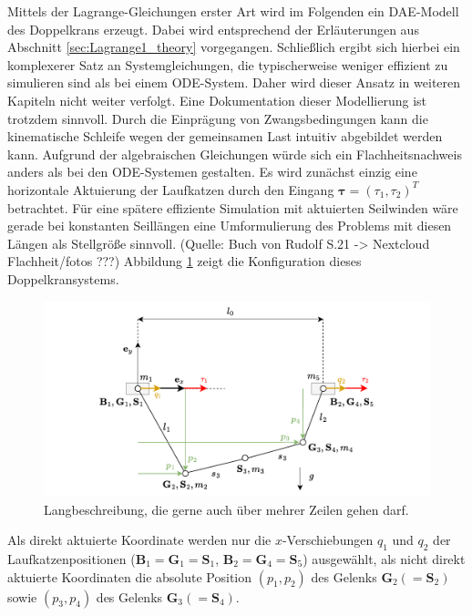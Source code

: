 Mittels der Lagrange-Gleichungen erster Art wird im Folgenden ein DAE-Modell des Doppelkrans erzeugt. Dabei wird entsprechend der Erläuterungen aus Abschnitt \ref{sec:Lagrange1_theory} vorgegangen. Schließlich ergibt sich hierbei ein komplexerer Satz an Systemgleichungen, die typischerweise weniger effizient zu simulieren sind als bei einem ODE-System. Daher wird dieser Ansatz in weiteren Kapiteln nicht weiter verfolgt. Eine Dokumentation dieser Modellierung ist trotzdem sinnvoll. Durch die Einprägung von Zwangsbedingungen kann die kinematische Schleife wegen der gemeinsamen Last intuitiv abgebildet werden kann. Aufgrund der algebraischen Gleichungen würde sich ein Flachheitsnachweis anders als bei den ODE-Systemen gestalten. Es wird zunächst einzig eine horizontale Aktuierung der Laufkatzen durch den Eingang $\mathbf{\tau} = (\tau_{1}, \tau_{2})^T$ betrachtet. Für eine spätere effiziente Simulation mit aktuierten Seilwinden wäre gerade bei konstanten Seillängen eine Umformulierung des Problems mit diesen Längen als Stellgröße sinnvoll. (Quelle: Buch von Rudolf S.21 -> Nextcloud Flachheit/fotos ???) Abbildung \ref{fig:DAE_double_crane_diagram} zeigt die Konfiguration dieses Doppelkransystems.

\begin{figure}[ht]
	\begin{center}
		\includegraphics[scale=1]{Pictures/DAE_double_crane_cartesian_diagram.pdf}
	\end{center}
	\caption[Kurzbeschreibung für Abbildungsverzeichnis]
	{Langbeschreibung, die gerne auch über mehrer Zeilen gehen darf.}
	\label{fig:DAE_double_crane_diagram}
\end{figure}

Als direkt aktuierte Koordinate werden nur die $x$-Verschiebungen $q_1$ und $q_2$ der Laufkatzenpositionen ($\mathbf{B}_1 = \mathbf{G}_1 = \mathbf{S}_1$, $\mathbf{B}_2 = \mathbf{G}_4 = \mathbf{S}_5$) ausgewählt, als nicht direkt aktuierte Koordinaten die absolute Position $(p_1, p_2)$ des Gelenks $\mathbf{G}_2 (= \mathbf{S}_2)$ sowie $(p_3, p_4)$ des Gelenks $\mathbf{G}_3 (=\mathbf{S}_4)$. 

